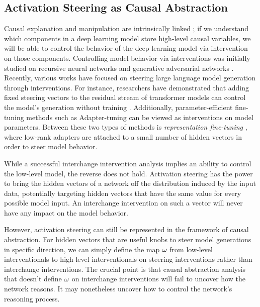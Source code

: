 \documentclass[twoside,11pt]{article}
\begin{document}
\subsection{Activation Steering as Causal Abstraction} \label{sec:activationsteering}
Causal explanation and manipulation are intrinsically linked \citep{Woodward2003}; if we understand which components in a deep learning model store high-level causal variables, we will be able to control the behavior of the deep learning model via intervention on those components.
Controlling model behavior via interventions was initially studied on recursive neural networks and generative adversarial networks \citep{Giulianelli:2018, Bau19a,Soulos:2020,Besserve20}. Recently, various works have focused on steering large language model generation through interventions. For instance, researchers have demonstrated that adding fixed steering vectors to the residual stream of transformer models can control the model's generation without training \citep{subramani2022extracting,turner2023activation,zou2023representation,vogel2024repeng,liInferenceTimeInterventionEliciting2024, wu2024advancing}. Additionally, parameter-efficient fine-tuning methods such as Adapter-tuning \citep{houlsbyParameterEfficientTransferLearning2019} can be viewed as interventions on model parameters. Between these two types of methods is \textit{representation fine-tuning} \citep{REFT}, where low-rank adapters are attached to a small number of hidden vectors in order to steer model behavior. 

While a successful interchange intervention analysis implies an ability to control the low-level model, the reverse does not hold. 
Activation steering has the power to bring the hidden vectors of a network off the distribution induced by the input data, potentially targeting hidden vectors that have the same value for every possible model input. An interchange intervention on such a vector will never have any impact on the model behavior. 

However, activation steering can still be represented in the framework of causal abstraction. For hidden vectors that are useful knobs to steer model generations in specific direction, we can simply define the map $\omega$ from low-level interventionals to high-level interventionals on steering interventions rather than interchange interventions. The crucial point is that causal abstraction analysis that doesn't define $\omega$ on interchange interventions will fail to uncover how the network reasons. It may nonetheless uncover how to control the network's reasoning process.
\end{document}
